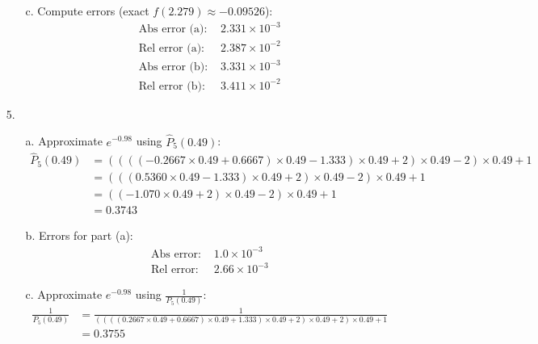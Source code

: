 \begin{enumerate}
\begin{itemize}
          \bigbreak

        \item[c.] Compute errors (exact \( f(2.279) \approx -0.09526 \)):
          \[
            \begin{aligned}
              \text{Abs error (a): } & \boxed{2.331 \times 10^{-3}} \\
              \text{Rel error (a): } & \boxed{2.387 \times 10^{-2}} \\
              \text{Abs error (b): } & \boxed{3.331 \times 10^{-3}} \\
              \text{Rel error (b): } & \boxed{3.411 \times 10^{-2}}
            \end{aligned}
          \]
      \end{itemize}

    \item[5.]
      \begin{itemize}
        \item[a.] Approximate \( e^{-0.98} \) using \( \hat{P}_5(0.49) \):
          \[
            \begin{aligned}
              \hat{P}_5(0.49) &= ((((-0.2667 \times 0.49 + 0.6667)
              \times 0.49 - 1.333) \times 0.49 + 2) \times 0.49 - 2)
              \times 0.49 + 1 \\
              &= (((0.5360 \times 0.49 - 1.333) \times 0.49 + 2)
              \times 0.49 - 2) \times 0.49 + 1 \\
              &= ((-1.070 \times 0.49 + 2) \times 0.49 - 2) \times 0.49 + 1 \\
              &= \boxed{0.3743}
            \end{aligned}
          \]

        \item[b.] Errors for part (a):
          \[
            \begin{aligned}
              \text{Abs error: } & \boxed{1.0 \times 10^{-3}} \\
              \text{Rel error: } & \boxed{2.66 \times 10^{-3}}
            \end{aligned}
          \]

        \item[c.] Approximate \( e^{-0.98} \) using \( \frac{1}{P_5(0.49)} \):
          \[
            \begin{aligned}
              \frac{1}{P_5(0.49)} &= \frac{1}{((((0.2667 \times 0.49
                  + 0.6667) \times 0.49 + 1.333) \times 0.49 + 2) \times
              0.49 + 2) \times 0.49 + 1} \\
              &= \boxed{0.3755}
            \end{aligned}
          \]


\end{itemize}
\end{enumerate}
